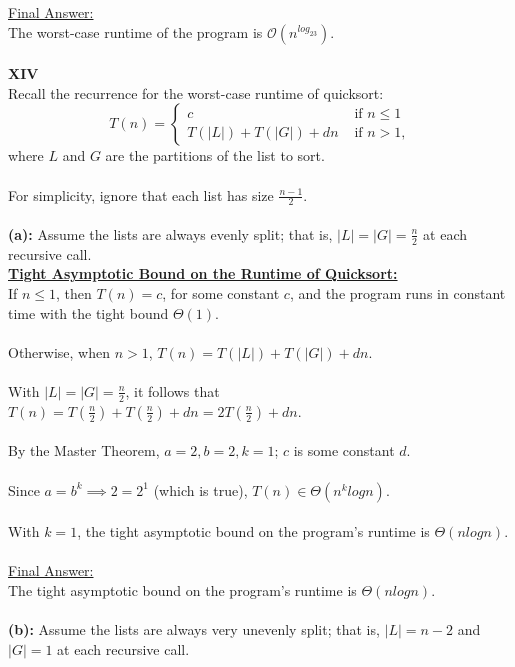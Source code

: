 \documentclass[12pt]{article}
\begin{document}
\underline{Final Answer:} \\
The worst-case runtime of the program is $\mathcal{O} (n^{log_23})$. \\
\\
\textbf{XIV} \\
Recall the recurrence for the worst-case runtime of quicksort:
\[ T(n) =
\begin{cases}
    c &\text{ if } n \leq 1 \\
    T(|L|) + T(|G|) + dn &\text{ if } n > 1 \text{,}
\end{cases}
\] where $L$ and $G$ are the partitions of the list to sort. \\
\\
For simplicity, ignore that each list has size \(\frac{n-1}{2}\). \\
\\
\textbf{(a):} Assume the lists are always evenly split; that is, \(|L| = |G| = \frac{n}{2}\) at each recursive call. \\
\textbf{\underline{Tight Asymptotic Bound on the Runtime of Quicksort:}} \\
If $n \leq 1$, then $T(n) = c$, for some constant $c$, and the program runs in constant time with the tight bound $\Theta (1)$. \\
\\
Otherwise, when $n > 1$, $T(n) = T(|L|) + T(|G|) + dn$. \\
\\
With $|L| = |G| = \frac{n}{2}$, it follows that $T(n) = T(\frac{n}{2}) + T(\frac{n}{2}) + dn = 2T(\frac{n}{2}) + dn$. \\
\\
By the Master Theorem, $a = 2, b = 2, k = 1$; $c$ is some constant $d$. \\
\\
Since $a = b^k \implies 2 = 2^1$ (which is true), $T(n) \in \Theta (n^k logn)$. \\
\\
With $k = 1$, the tight asymptotic bound on the program's runtime is $\Theta (n logn)$. \\
\\
\underline{Final Answer:} \\
The tight asymptotic bound on the program's runtime is $\Theta (n logn)$. \\
\\
\textbf{(b):} Assume the lists are always very unevenly split; that is, \(|L| = n - 2\) and \(|G| = 1\) at each recursive call. \\
\end{document}
